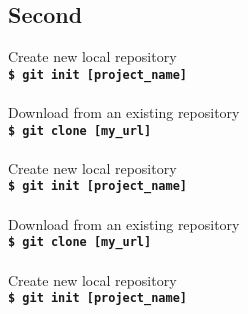 \documentclass[a3paper,margin=4pt,landscape]{article}
\newcommand{\cmd}[2]{
	#1\\
	\texttt{\textbf{\$ git #2}}\\
	\\
}
\begin{document}
\begin{multicols}{4}


\section*{Second}

\cmd{Create new local repository}{init [project\_name]}
\cmd{Download from an existing repository}{clone [my\_url]}
\cmd{Create new local repository}{init [project\_name]}
\cmd{Download from an existing repository}{clone [my\_url]}
\cmd{Create new local repository}{init [project\_name]}



\end{multicols}
\end{document}
